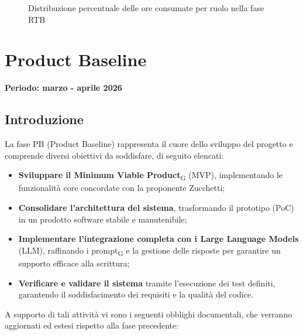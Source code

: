 \documentclass[11pt,a4paper]{article}
\newcommand{\gls}[1]{#1\textsubscript{G}}
\begin{document}
\begin{figure}[H]
    \centering
    \caption{Distribuzione percentuale delle ore consumate per ruolo nella fase RTB}
    \label{fig:torta_ruoli_rtb}
\end{figure}


\newpage
\section{Product Baseline}
\small\textbf{Periodo: marzo - aprile 2026}
\subsection{Introduzione}
La fase PB (Product Baseline) rappresenta il cuore dello sviluppo del progetto e comprende diversi obiettivi da soddisfare, di seguito elencati:
\begin{itemize}
    \item \textbf{Sviluppare il Minimum Viable Product}\textsubscript{G} (MVP), implementando le funzionalità core concordate con la proponente Zucchetti;
    \item \textbf{Consolidare l'architettura del sistema}, trasformando il prototipo (PoC) in un prodotto software stabile e manutenibile;
    \item \textbf{Implementare l'integrazione completa con i Large Language Models} (LLM), raffinando i \gls{prompt} e la gestione delle risposte per garantire un supporto efficace alla scrittura;
    \item \textbf{Verificare e validare il sistema} tramite l'esecuzione dei test definiti, garantendo il soddisfacimento dei requisiti e la qualità del codice.
\end{itemize}

\noindent A supporto di tali attività vi sono i seguenti obblighi documentali, che verranno aggiornati ed estesi rispetto alla fase precedente:
\end{document}
